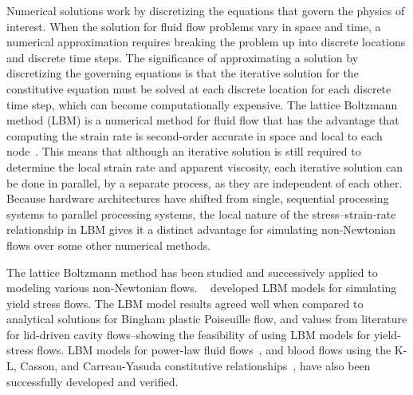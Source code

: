 \documentclass[pdftex,ms]{pittetd}
\begin{document}
Numerical solutions work by discretizing the equations that govern the physics of interest.
When the solution for fluid flow problems vary in space and time, a numerical approximation requires breaking the problem up into discrete locations and discrete time steps.
The significance of approximating a solution by discretizing the governing equations is that the iterative solution for the constitutive equation must be solved at each discrete location for each discrete time step, which can become computationally expensive.
The lattice Boltzmann method (LBM) is a numerical method for fluid flow that has the advantage that computing the strain rate is second-order accurate in space and local to each node~\cite{kruger2010second}.
This means that although an iterative solution is still required to determine the local strain rate and apparent viscosity, each iterative solution can be done in parallel, by a separate process, as they are independent of each other.
Because hardware architectures have shifted from single, sequential processing systems to parallel processing systems, the local nature of the stress--strain-rate relationship in LBM gives it a distinct advantage for simulating non-Newtonian flows over some other numerical methods.

The lattice Boltzmann method has been studied and successively applied to modeling various non-Newtonian flows.
~\citet{tang2011bingham,chai2011multiple,fallah2012multiple,chen2014simulations,vikhansky2008lattice,wang2008lattice} developed LBM models for simulating yield stress flows.
The LBM model results agreed well when compared to analytical solutions for Bingham plastic Poiseuille flow, and values from literature for lid-driven cavity flows--showing the feasibility of using LBM models for yield-stress flows.
LBM models for power-law fluid flows~\cite{wang2011lattice,wang2015localized,boyd2006second,chai2011multiple}, and blood flows using the K-L, Casson, and Carreau-Yasuda constitutive relationships~\cite{ashrafizaadeh2009comparison}, have also been successfully developed and verified. %
\end{document}
